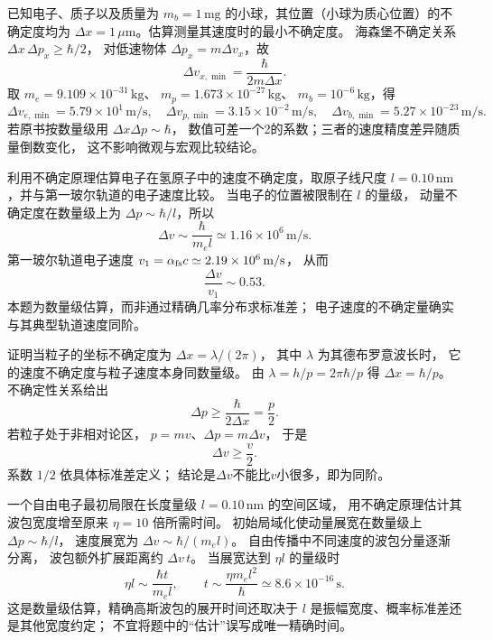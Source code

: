 已知电子、质子以及质量为 $m_b=1\,\mathrm{mg}$ 的小球，其位置（小球为质心位置）的不确定度均为 $\Delta x=1\,\mu\mathrm m$。估算测量其速度时的最小不确定度。
\exsolution
海森堡不确定关系
$\Delta x\,\Delta p_x\geq\hbar/2$，
对低速物体 $\Delta p_x=m\Delta v_x$，故
\[
 \Delta v_{x,\min}=\frac{\hbar}{2m\Delta x}.
\]
取 $m_e=9.109\times10^{-31}\,\mathrm{kg}$、
$m_p=1.673\times10^{-27}\,\mathrm{kg}$、
$m_b=10^{-6}\,\mathrm{kg}$，得
\[
 \boxed{\Delta v_{e,\min}=5.79\times10^1\,\mathrm{m/s}},
 \quad\boxed{\Delta v_{p,\min}=3.15\times10^{-2}\,\mathrm{m/s}},
 \quad\boxed{\Delta v_{b,\min}=5.27\times10^{-23}\,\mathrm{m/s}}.
\]
\excheck 若原书按数量级用 $\Delta x\Delta p\sim\hbar$，
数值可差一个2的系数；三者的速度精度差异随质量倒数变化，
这不影响微观与宏观比较结论。

利用不确定原理估算电子在氢原子中的速度不确定度，取原子线尺度 $l=0.10\,\mathrm{nm}$，并与第一玻尔轨道的电子速度比较。
\exsolution
当电子的位置被限制在 $l$ 的量级，
动量不确定度在数量级上为
$\Delta p\sim\hbar/l$，所以
\[
 \boxed{\Delta v\sim\frac{\hbar}{m_e l}
 \simeq1.16\times10^6\,\mathrm{m/s}}.
\]
第一玻尔轨道电子速度
$v_1=\alpha_{\rm fs}c\simeq2.19\times10^6\,\mathrm{m/s}$，
从而
\[
 \boxed{\frac{\Delta v}{v_1}\sim0.53}.
\]
\excheck 本题为数量级估算，而非通过精确几率分布求标准差；
电子速度的不确定量确实与其典型轨道速度同阶。

证明当粒子的坐标不确定度为 $\Delta x=\lambda/(2\pi)$，
其中 $\lambda$ 为其德布罗意波长时，
它的速度不确定度与粒子速度本身同数量级。
\exsolution
由 $\lambda=h/p=2\pi\hbar/p$ 得
$\Delta x=\hbar/p$。
不确定性关系给出
\[
 \Delta p\geq\frac{\hbar}{2\Delta x}=\frac p2.
\]
若粒子处于非相对论区，
$p=mv$、$\Delta p=m\Delta v$，
于是
\[
 \boxed{\Delta v\geq\frac v2}.
\]
\excheck 系数 $1/2$ 依具体标准差定义；
结论是$\Delta v$不能比$v$小很多，即为同阶。

一个自由电子最初局限在长度量级
$l=0.10\,\mathrm{nm}$ 的空间区域，
用不确定原理估计其波包宽度增至原来
$\eta=10$ 倍所需时间。
\exsolution
初始局域化使动量展宽在数量级上
$\Delta p\sim\hbar/l$，
速度展宽为 $\Delta v\sim\hbar/(m_e l)$。
自由传播中不同速度的波包分量逐渐分离，
波包额外扩展距离约 $\Delta v\,t$。
当展宽达到 $\eta l$ 的量级时
\[
 \eta l\sim\frac{\hbar t}{m_e l},
 \qquad
 \boxed{t\sim\frac{\eta m_e l^2}{\hbar}
 \simeq8.6\times10^{-16}\,\mathrm s}.
\]
\excheck 这是数量级估算，精确高斯波包的展开时间还取决于
$l$ 是振幅宽度、概率标准差还是其他宽度约定；
不宜将题中的“估计”误写成唯一精确时间。


